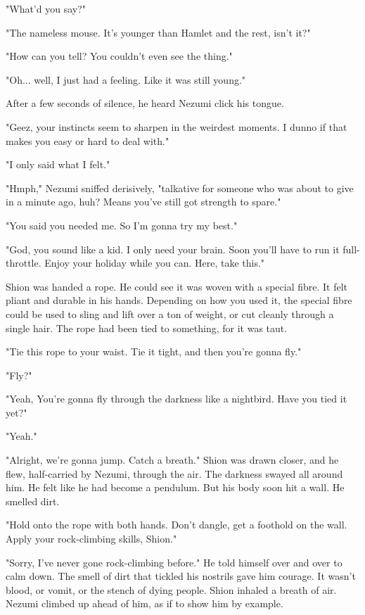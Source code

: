 "What'd you say?"

"The nameless mouse. It's younger than Hamlet and the rest, isn't it?"

"How can you tell? You couldn't even see the thing."

"Oh... well, I just had a feeling. Like it was still young."

After a few seconds of silence, he heard Nezumi click his tongue.

"Geez, your instincts seem to sharpen in the weirdest moments. I dunno
if that makes you easy or hard to deal with."

"I only said what I felt."

"Hmph," Nezumi sniffed derisively, "talkative for someone who was about
to give in a minute ago, huh? Means you've still got strength to spare."

"You said you needed me. So I'm gonna try my best."

"God, you sound like a kid. I only need your brain. Soon you'll have to
run it full-throttle. Enjoy your holiday while you can. Here, take
this."

Shion was handed a rope. He could see it was woven with a special fibre.
It felt pliant and durable in his hands. Depending on how you used it,
the special fibre could be used to sling and lift over a ton of weight,
or cut cleanly through a single hair. The rope had been tied to
something, for it was taut.

"Tie this rope to your waist. Tie it tight, and then you're gonna fly."

"Fly?"

"Yeah, You're gonna fly through the darkness like a nightbird. Have you
tied it yet?"

"Yeah."

"Alright, we're gonna jump. Catch a breath." Shion was drawn closer, and
he flew, half-carried by Nezumi, through the air. The darkness swayed
all around him. He felt like he had become a pendulum. But his body soon
hit a wall. He smelled dirt.

"Hold onto the rope with both hands. Don't dangle, get a foothold on the
wall. Apply your rock-climbing skills, Shion."

"Sorry, I've never gone rock-climbing before." He told himself over and
over to calm down. The smell of dirt that tickled his nostrils gave him
courage. It wasn't blood, or vomit, or the stench of dying people. Shion
inhaled a breath of air. Nezumi climbed up ahead of him, as if to show
him by example.

